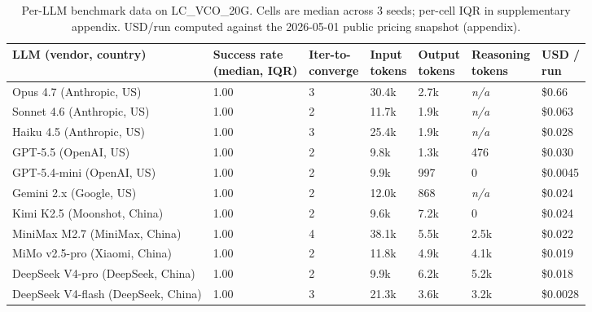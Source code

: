 \begin{table}[t]
  \centering
  \caption{Per-LLM benchmark data on LC\_VCO\_20G. Cells are
    median across 3 seeds; per-cell IQR in supplementary appendix.
    USD/run computed against the 2026-05-01 public pricing
    snapshot (appendix).}
  \label{tab:percellm}
  \footnotesize
  \renewcommand{\arraystretch}{0.88}
  \setlength{\tabcolsep}{3pt}
  \begin{tabular}{l l l l l l l}
    \toprule
    \textbf{LLM (vendor, country)} &
      \makecell[l]{\textbf{Success rate}\\\textbf{(median, IQR)}} &
      \makecell[l]{\textbf{Iter-to-}\\\textbf{converge}} &
      \makecell[l]{\textbf{Input}\\\textbf{tokens}} &
      \makecell[l]{\textbf{Output}\\\textbf{tokens}} &
      \makecell[l]{\textbf{Reasoning}\\\textbf{tokens}} &
      \makecell[l]{\textbf{USD /}\\\textbf{run}} \\
    \midrule
    Opus 4.7 (Anthropic, US)            & 1.00 & 3 & 30.4k & 2.7k  & \textit{n/a} & \$0.66   \\
    Sonnet 4.6 (Anthropic, US)          & 1.00 & 2 & 11.7k & 1.9k  & \textit{n/a} & \$0.063  \\
    Haiku 4.5 (Anthropic, US)           & 1.00 & 3 & 25.4k & 1.9k  & \textit{n/a} & \$0.028  \\
    GPT-5.5 (OpenAI, US)                & 1.00 & 2 & 9.8k  & 1.3k  & 476          & \$0.030  \\
    GPT-5.4-mini (OpenAI, US)           & 1.00 & 2 & 9.9k  & 997   & 0            & \$0.0045 \\
    Gemini 2.x (Google, US)             & 1.00 & 2 & 12.0k & 868   & \textit{n/a} & \$0.024  \\
    Kimi K2.5 (Moonshot, China)         & 1.00 & 2 & 9.6k  & 7.2k  & 0            & \$0.024  \\
    MiniMax M2.7 (MiniMax, China)       & 1.00 & 4 & 38.1k & 5.5k  & 2.5k         & \$0.022  \\
    MiMo v2.5-pro (Xiaomi, China)       & 1.00 & 2 & 11.8k & 4.9k  & 4.1k         & \$0.019  \\
    DeepSeek V4-pro (DeepSeek, China)   & 1.00 & 2 & 9.9k  & 6.2k  & 5.2k         & \$0.018  \\
    DeepSeek V4-flash (DeepSeek, China) & 1.00 & 3 & 21.3k & 3.6k  & 3.2k         & \$0.0028 \\
    \bottomrule
  \end{tabular}
\end{table}

